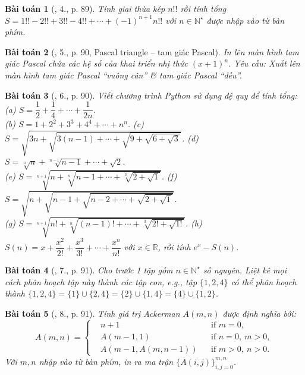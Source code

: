 \documentclass{article}
\newtheorem{baitoan}{Bài toán}
\begin{document}
\begin{baitoan}[\cite{Que_BT_Python}, 4., p. 89]
    Tính giai thừa kép $n!!$ rồi tính tổng $S = 1!! - 2!! + 3!! - 4!! + \cdots + (-1)^{n+1}n!!$ với $n\in\mathbb{N}^\star$ được nhập vào từ bàn phím.
\end{baitoan}

\begin{baitoan}[\cite{Que_BT_Python}, 5., p. 90, Pascal triangle -- tam giác Pascal]
    In lên màn hình tam giác Pascal chứa các hệ số của khai triển nhị thức $(x + 1)^n$. Yêu cầu: Xuất lên màn hình tam giác Pascal ``vuông cân'' \& tam giác Pascal ``đều''.
\end{baitoan}

\begin{baitoan}[\cite{Que_BT_Python}, 6., p. 90]
    Viết chương trình Python sử dụng đệ quy để tính tổng: (a) $S = \dfrac{1}{2} + \dfrac{1}{4} + \cdots + \dfrac{1}{2n}$.\\(b) $S = 1 + 2^2 + 3^3 + 4^4 + \cdots + n^n$. (c) $S = \sqrt{3n + \sqrt{3(n - 1) + \cdots + \sqrt{9 + \sqrt{6 + \sqrt{3}}}}}$. (d) $S = \sqrt[n]{n} + \sqrt[n - 1]{n - 1} + \cdots + \sqrt{2}$.\\(e) $S = \sqrt[n + 1]{n + \sqrt[n]{n - 1 + \cdots + \sqrt[3]{2 + \sqrt{1}}}}$. (f) $S = \sqrt{n + \sqrt{n - 1 + \sqrt{n - 2 + \cdots + \sqrt{2 + \sqrt{1}}}}}$.\\(g) $S = \sqrt[n+1]{n! + \sqrt[n]{(n - 1)! + \cdots + \sqrt[3]{2! + \sqrt{1!}}}}$. (h) $S(n) = x + \dfrac{x^2}{2!} + \dfrac{x^3}{3!} + \cdots + \dfrac{x^n}{n!}$ với $x\in\mathbb{R}$, rồi tính $e^x - S(n)$.
\end{baitoan}

\begin{baitoan}[\cite{Que_BT_Python}, 7., p. 91]
    Cho trước 1 tập gồm $n\in\mathbb{N}^\star$ số nguyên. Liệt kê mọi cách phân hoạch tập này thành các tập con, e.g., tập $\{1,2,4\}$ có thể phân hoạch thành $\{1,2,4\} = \{1\}\cup\{2,4\} = \{2\}\cup\{1,4\}= \{4\}\cup\{1,2\}$.
\end{baitoan}

\begin{baitoan}[\cite{Que_BT_Python}, 8., p. 91]
    Tính giá trị Ackerman $A(m,n)$ được định nghĩa bởi:
    \begin{equation*}
        A(m,n) = \left\{\begin{split}
            &n + 1&&\mbox{if } m = 0,\\
            &A(m - 1,1)&&\mbox{if } n = 0,\ m > 0,\\
            &A(m - 1,A(m,n - 1))&&\mbox{if } m > 0,\ n > 0.
        \end{split}\right.
    \end{equation*}
    Với $m,n$ nhập vào từ bàn phím, in ra ma trận $\{A(i,j)\}_{i,j=0}^{m,n}$.
\end{baitoan}
\end{document}
